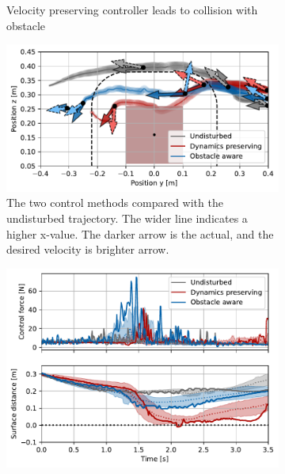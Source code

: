 \begin{figure}
\begin{subfigure}{\columnwidth}
      \caption{Velocity preserving controller leads to collision with obstacle}
      \label{fig:franka_sequence_obstacle_aware}
    \end{subfigure}
    \begin{subfigure}{\columnwidth}
      \centerline{\includegraphics[width=\textwidth]{figures/robot_arm_trajectory_xyz}}
      \caption{The two control methods compared with the undisturbed trajectory. The wider line indicates a higher x-value. The darker arrow is the actual, and the desired velocity is brighter arrow.}
      \label{fig:robot_arm_trajectory_xyz}
    \end{subfigure}
    \begin{subfigure}{\columnwidth}
		\includegraphics[width=\textwidth]{figures/trajectory_comparison_force_and_distance}

\end{subfigure}
\end{figure}
